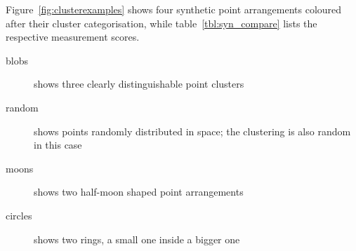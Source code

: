 Figure~\ref{fig:clusterexamples} shows four synthetic point arrangements coloured after their cluster categorisation, while table~\ref{tbl:syn_compare} lists the respective measurement scores.
\begin{description}
\item[blobs] shows three clearly distinguishable point clusters
\item[random] shows points randomly distributed in space; the clustering is also random in this case
\item[moons] shows two half-moon shaped point arrangements
\item[circles] shows two rings, a small one inside a bigger one
\end{description}



